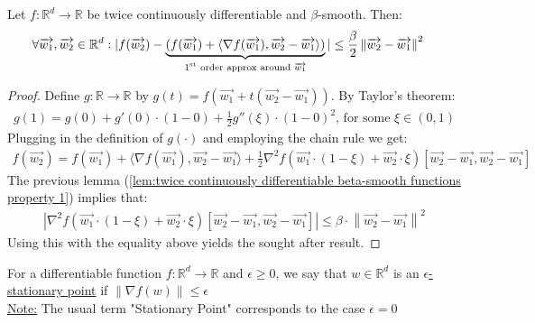 \documentclass[12pt]{article}
\newcommand{\norm}[1]{\left\| #1 \right\|}
\begin{document}
	\begin{lemma}
	\label{lem:twice continuously differentiable beta-smooth functions property 2}
		Let $f:\mathbb{R}^d\to\mathbb{R}$ be twice continuously differentiable and $\beta$-smooth. Then:
		\begin{align*}
		    & \forall \overrightarrow{w_1}, \overrightarrow{w_2} \in \mathbb{R}^d :  |f(\overrightarrow{w_2}) - \underbrace{(f(\overrightarrow{w_1}) + \langle\nabla{f(\overrightarrow{w_1})}, \overrightarrow{w_2}-\overrightarrow{w_1}\rangle)}_\text{1\textsuperscript{st} order approx around $\overrightarrow{w_1}$}| \leq \frac{\beta}{2}\norm{\overrightarrow{w_2}-\overrightarrow{w_1}}^2
	    \end{align*}
	\end{lemma}
	\begin{proof}
	    Define $g:\mathbb{R}\to\mathbb{R}$ by $g(t)=f(\overrightarrow{w_1} + t(\overrightarrow{w_2}-\overrightarrow{w_1}))$. By Taylor's theorem:
		\begin{align*}
		    g(1) = g(0) + g'(0)\cdot(1-0) + \frac{1}{2}g''(\xi)\cdot(1-0)^2 \text{, for some $\xi\in(0,1)$}
        \end{align*}
	    Plugging in the definition of $g(\cdot)$ and employing the chain rule we get:
		\begin{align*}
		    f(\overrightarrow{w_2}) = f(\overrightarrow{w_1}) + \langle\nabla{f(\overrightarrow{w_1})},\overrightarrow{w_2}-\overrightarrow{w_1}\rangle + \frac{1}{2}\nabla^2{f(\overrightarrow{w_1}\cdot(1-\xi) + \overrightarrow{w_2}\cdot\xi)[\overrightarrow{w_2}-\overrightarrow{w_1},\overrightarrow{w_2}-\overrightarrow{w_1}]}
        \end{align*}
        The previous lemma (\ref{lem:twice continuously differentiable beta-smooth functions property 1}) implies that:
		\begin{align*}
		    |\nabla^2{f(\overrightarrow{w_1}\cdot(1-\xi) + \overrightarrow{w_2}\cdot\xi)[\overrightarrow{w_2}-\overrightarrow{w_1},\overrightarrow{w_2}-\overrightarrow{w_1}]}| \leq \beta\cdot\norm{\overrightarrow{w_2}-\overrightarrow{w_1}}^2
        \end{align*}
        Using this with the equality above yields the sought after result.
	\end{proof}
	\begin{definition}
	For a differentiable function $f:\mathbb{R}^d\to\mathbb{R}$ and $\epsilon\geq0$, we say that $w\in\mathbb{R}^d$ is an \underline{$\epsilon$-stationary point} if $\norm{\nabla{f(w)}}\leq\epsilon$
	\\\underline{Note:} The usual term "Stationary Point" corresponds to the case $\epsilon=0$
	\end{definition}
\end{document}
